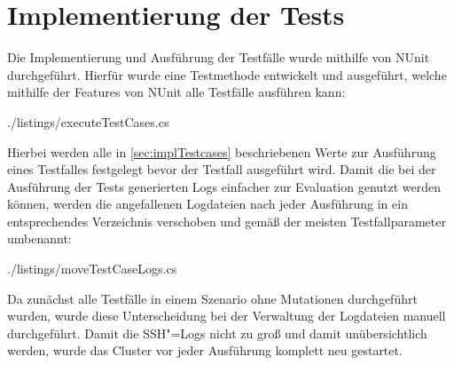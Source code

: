 \section{Implementierung der Tests}
\label{sec:implTestcases}

Die Implementierung und Ausführung der Testfälle wurde mithilfe von NUnit durchgeführt.
Hierfür wurde eine Testmethode entwickelt und ausgeführt, welche mithilfe der Features von NUnit alle Testfälle ausführen kann:


{./listings/executeTestCases.cs}

Hierbei werden alle in \autoref{sec:implTestcases} beschriebenen Werte zur Ausführung eines Testfalles festgelegt bevor der Testfall ausgeführt wird.
Damit die bei der Ausführung der Tests generierten Logs einfacher zur Evaluation genutzt werden können, werden die angefallenen Logdateien nach jeder Ausführung in ein entsprechendes Verzeichnis verschoben und gemäß der meisten Testfallparameter umbenannt:


{./listings/moveTestCaseLogs.cs}

Da zunächst alle Testfälle in einem Szenario ohne Mutationen durchgeführt wurden, wurde diese Unterscheidung bei der Verwaltung der Logdateien manuell durchgeführt.
Damit die SSH"=Logs nicht zu groß und damit unübersichtlich werden, wurde das Cluster vor jeder Ausführung komplett neu gestartet.

